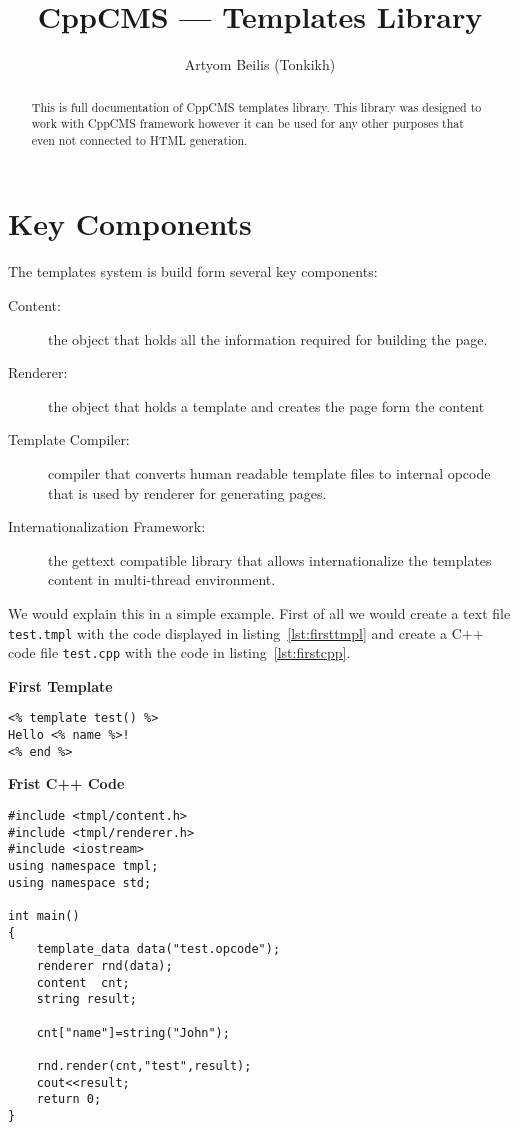 \documentclass{article}
\title{CppCMS --- Templates Library}
\author{Artyom Beilis (Tonkikh)}
\newcommand{\tw}[1]{\texttt{#1}}
\renewcommand{\caption}[1]{\textbf{#1}}
\begin{document}
\maketitle
\tableofcontents

\begin{abstract}
This is full documentation of CppCMS templates library. This library was designed to work with CppCMS framework however
it can be used for any other purposes that even not connected to HTML generation.
\end{abstract}
\section{Key Components}
The templates system is build form several key components:
\begin{description}
\item[Content:] the object that holds all the information required for building the page.
\item[Renderer:] the object that holds a template and creates the page form the content
\item[Template Compiler:] compiler that converts human readable template files to internal opcode that is used by renderer for generating pages.
\item[Internationalization Framework:] the gettext compatible library that allows internationalize the templates content in multi-thread environment.
\end{description}

We would explain this in a simple example.
First of all we would create a text file \tw{test.tmpl} with the
code displayed in listing~\ref{lst:firsttmpl} and create a C++ code file \tw{test.cpp}
with the code in listing~\ref{lst:firstcpp}.

\begin{program}
\caption{First Template\label{lst:firsttmpl}}
\begin{verbatim}
<% template test() %>
Hello <% name %>!
<% end %>
\end{verbatim}
\end{program}


\begin{program}
\caption{Frist C++ Code\label{lst:firstcpp}}
\begin{verbatim}
#include <tmpl/content.h>
#include <tmpl/renderer.h>
#include <iostream>
using namespace tmpl;
using namespace std;

int main()
{
    template_data data("test.opcode");
    renderer rnd(data);
    content  cnt;
    string result;

    cnt["name"]=string("John");
    
    rnd.render(cnt,"test",result);
    cout<<result;
    return 0;
}
\end{verbatim}
\end{program}
\end{document}

